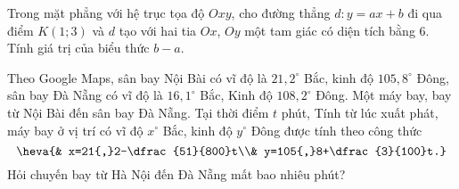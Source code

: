\begin{ex}%
	Trong mặt phẳng với hệ trục tọa độ $Oxy$, cho đường thẳng $d\colon y=ax+b$ đi qua điểm $K(1 ; 3)$ và $d$ tạo với hai tia $Ox$, $Oy$ một tam giác có diện tích bằng $6$. Tính giá trị của biểu thức $b-a$.
\end{ex}

\begin{ex}%
	Theo Google Maps, sân bay Nội Bài có vĩ độ là $21{,}2^\circ$ Bắc, kinh độ $105{,}8^\circ$ Đông, sân bay Đà Nẵng có vĩ độ là $16{,}1^\circ$ Bắc, Kinh độ $108{,}2^\circ$ Đông. Một máy bay, bay từ Nội Bài đến sân bay Đà Nẵng. Tại thời điểm $t$ phút, Tính từ lúc xuất phát, máy bay ở vị trí có vĩ độ $x^\circ$ Bắc, kinh độ $y^\circ$ Đông được tính theo công thức
	\[\heva{& x=21{,}2-\dfrac{51}{800}t\\& y=105{,}8+\dfrac{3}{100}t.}\]
	Hỏi chuyến bay từ Hà Nội đến Đà Nẵng mất bao nhiêu phút?
\end{ex}

